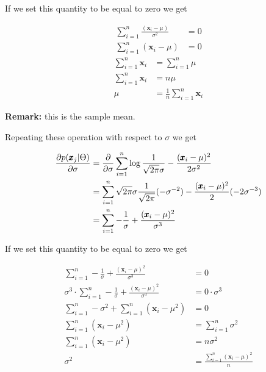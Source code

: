 If we set this quantity to be equal to zero we get

\begin{align*}
	\sum_{i=1}^{n}\frac{(\pmb{x}_{i}- \mu)}{\sigma^{2}} & = 0 \\
	\sum_{i=1}^{n}(\pmb{x}_{i}- \mu)                    & = 0
\end{align*}
\begin{align*}
	\sum_{i=1}^{n}\pmb{x}_{i} & = \sum_{i=1}^{n}\mu                    \\
	\sum_{i=1}^{n}\pmb{x}_{i} & = n \mu                                \\
	\mu                       & = \frac{1}{n}\sum_{i=1}^{n}\pmb{x}_{i}
\end{align*}

\textbf{Remark:} this is the sample mean.
\newline

Repeating these operation with respect to $\sigma$ we get

\begin{align*}
	\pdv{p(\pmb{x}_j|\Theta)}{\sigma} & = \pdv{}{\sigma}\sum_{i=1}^{n}\log \frac{1}{\sqrt{2\pi}\sigma}- \frac{(\pmb{x}_{i}-\mu)^{2}}{2\sigma^{2}}                 \\
	                                  & = \sum_{i=1}^{n}\sqrt{2 \pi}\sigma \frac{1}{\sqrt{2 \pi}}(- \sigma^{-2})-\frac{(\pmb{x}_{i}- \mu)^{2}}{2}(-2 \sigma^{-3}) \\
	                                  & = \sum_{i=1}^{n}-\frac{1}{\sigma}+ \frac{(\pmb{x}_{i}- \mu)^{2}}{\sigma^{3}}
\end{align*}

If we set this quantity to be equal to zero we get

\begin{align*}
	\sum_{i=1}^{n}-\frac{1}{\sigma}+ \frac{(\pmb{x}_{i}- \mu)^{2}}{\sigma^{3}}                 & = 0                                              \\
	\sigma^{3}\cdot \sum_{i=1}^{n}-\frac{1}{\sigma}+ \frac{(\pmb{x}_{i}- \mu)^{2}}{\sigma^{3}} & = 0 \cdot \sigma^{3}                             \\
	\sum_{i=1}^{n}-\sigma^{2}+ \sum_{i=1}^{n}(\pmb{x}_{i}- \mu^{2})                            & = 0                                              \\
	\sum_{i=1}^{n}(\pmb{x}_{i}- \mu^{2})                                                       & = \sum_{i=1}^{n}\sigma^{2}                       \\
	\sum_{i=1}^{n}(\pmb{x}_{i}- \mu^{2})                                                       & = n \sigma^{2}                                   \\
	\sigma^{2}                                                                                 & = \frac{\sum_{i=1}^{n}(\pmb{x}_{i}- \mu)^{2}}{n}
\end{align*}

